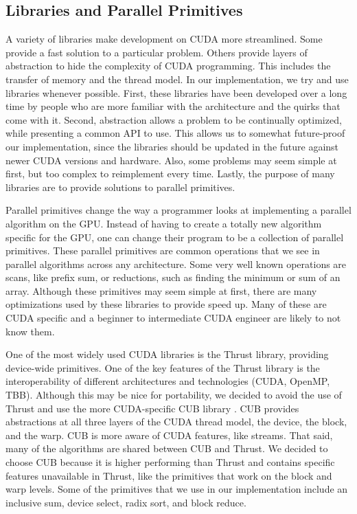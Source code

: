 \subsection{Libraries and Parallel Primitives}
\label{sec:primitives}

A variety of libraries make development on CUDA more streamlined.
Some provide a fast solution to a particular problem.
Others provide layers of abstraction to hide the complexity of CUDA programming.
This includes the transfer of memory and the thread model.
In our implementation, we try and use libraries whenever possible.
First, these libraries have been developed over a long time by people who are more familiar with the architecture and the quirks that come with it.
Second, abstraction allows a problem to be continually optimized, while presenting a common API to use.
This allows us to somewhat future-proof our implementation, since the libraries should be updated in the future against newer CUDA versions and hardware.
Also, some problems may seem simple at first, but too complex to reimplement every time.
Lastly, the purpose of many libraries are to provide solutions to parallel primitives.

Parallel primitives change the way a programmer looks at implementing a parallel algorithm on the GPU.
Instead of having to create a totally new algorithm specific for the GPU, one can change their program to be a collection of parallel primitives.
These parallel primitives are common operations that we see in parallel algorithms across any architecture.
Some very well known operations are scans, like prefix sum, or reductions, such as finding the minimum or sum of an array.
Although these primitives may seem simple at first, there are many optimizations used by these libraries to provide speed up.
Many of these are CUDA specific and a beginner to intermediate CUDA engineer are likely to not know them.

One of the most widely used CUDA libraries is the Thrust \cite{Thrust} library, providing device-wide primitives.
One of the key features of the Thrust library is the interoperability of different architectures and technologies (CUDA, OpenMP, TBB).
Although this may be nice for portability, we decided to avoid the use of Thrust and use the more CUDA-specific CUB library \cite{CUB}.
CUB provides abstractions at all three layers of the CUDA thread model, the device, the block, and the warp.
CUB is more aware of CUDA features, like streams.
That said, many of the algorithms are shared between CUB and Thrust.
We decided to choose CUB because it is higher performing than Thrust and contains specific features unavailable in Thrust, like the primitives that work on the block and warp levels.
Some of the primitives that we use in our implementation include an inclusive sum, device select, radix sort, and block reduce.

